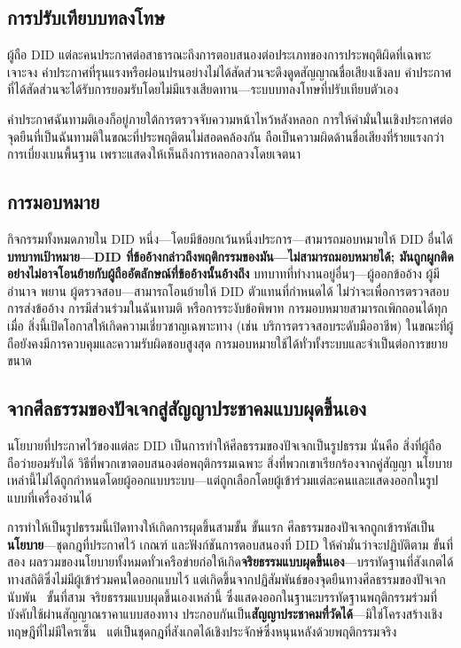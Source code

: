 \documentclass[11pt,a4paper,twocolumn]{article}
\begin{document}
\subsection{การปรับเทียบบทลงโทษ}

ผู้ถือ DID แต่ละคนประกาศต่อสาธารณะถึงการตอบสนองต่อประเภทของการประพฤติผิดที่เฉพาะเจาะจง คำประกาศที่รุนแรงหรือผ่อนปรนอย่างไม่ได้สัดส่วนจะดึงดูดสัญญาณชื่อเสียงเชิงลบ คำประกาศที่ได้สัดส่วนจะได้รับการยอมรับโดยไม่มีแรงเสียดทาน---ระบบบทลงโทษที่ปรับเทียบตัวเอง

คำประกาศฉันทามติเองก็อยู่ภายใต้การตรวจจับความหน้าไหว้หลังหลอก การให้คำมั่นในเชิงประกาศต่อจุดยืนที่เป็นฉันทามติในขณะที่ประพฤติตนไม่สอดคล้องกัน ถือเป็นความผิดด้านชื่อเสียงที่ร้ายแรงกว่าการเบี่ยงเบนพื้นฐาน เพราะแสดงให้เห็นถึงการหลอกลวงโดยเจตนา

\subsection{การมอบหมาย}

กิจกรรมทั้งหมดภายใน DID หนึ่ง---โดยมีข้อยกเว้นหนึ่งประการ---สามารถมอบหมายให้ DID อื่นได้ \textbf{บทบาทเป้าหมาย---DID ที่ข้ออ้างกล่าวถึงพฤติกรรมของมัน---ไม่สามารถมอบหมายได้; มันถูกผูกติดอย่างไม่อาจโอนย้ายกับผู้ถืออัตลักษณ์ที่ข้ออ้างนั้นอ้างถึง} บทบาทที่ทำงานอยู่อื่นๆ---ผู้ออกข้ออ้าง ผู้มีอำนาจ พยาน ผู้ตรวจสอบ---สามารถโอนย้ายให้ DID ตัวแทนที่กำหนดได้ ไม่ว่าจะเพื่อการตรวจสอบ การส่งข้ออ้าง การมีส่วนร่วมในฉันทามติ หรือการระงับข้อพิพาท การมอบหมายสามารถเพิกถอนได้ทุกเมื่อ สิ่งนี้เปิดโอกาสให้เกิดความเชี่ยวชาญเฉพาะทาง (เช่น บริการตรวจสอบระดับมืออาชีพ) ในขณะที่ผู้ถือยังคงมีการควบคุมและความรับผิดชอบสูงสุด การมอบหมายใช้ได้ทั่วทั้งระบบและจำเป็นต่อการขยายขนาด

\subsection{จากศีลธรรมของปัจเจกสู่สัญญาประชาคมแบบผุดขึ้นเอง}

นโยบายที่ประกาศไว้ของแต่ละ DID เป็นการทำให้ศีลธรรมของปัจเจกเป็นรูปธรรม นั่นคือ สิ่งที่ผู้ถือถือว่ายอมรับได้ วิธีที่พวกเขาตอบสนองต่อพฤติกรรมเฉพาะ สิ่งที่พวกเขาเรียกร้องจากคู่สัญญา นโยบายเหล่านี้ไม่ได้ถูกกำหนดโดยผู้ออกแบบระบบ---แต่ถูกเลือกโดยผู้เข้าร่วมแต่ละคนและแสดงออกในรูปแบบที่เครื่องอ่านได้

การทำให้เป็นรูปธรรมนี้เปิดทางให้เกิดการผุดขึ้นสามขั้น ขั้นแรก ศีลธรรมของปัจเจกถูกเข้ารหัสเป็น\textbf{นโยบาย}---ชุดกฎที่ประกาศไว้ เกณฑ์ และฟังก์ชันการตอบสนองที่ DID ให้คำมั่นว่าจะปฏิบัติตาม ขั้นที่สอง ผลรวมของนโยบายทั้งหมดทั่วเครือข่ายก่อให้เกิด\textbf{จริยธรรมแบบผุดขึ้นเอง}---บรรทัดฐานที่สังเกตได้ทางสถิติซึ่งไม่มีผู้เข้าร่วมคนใดออกแบบไว้ แต่เกิดขึ้นจากปฏิสัมพันธ์ของจุดยืนทางศีลธรรมของปัจเจกนับพัน~\cite{durkheim1893} ขั้นที่สาม จริยธรรมแบบผุดขึ้นเองเหล่านี้ ซึ่งแสดงออกในฐานะบรรทัดฐานพฤติกรรมร่วมที่บังคับใช้ผ่านสัญญาณราคาแบบสองทาง ประกอบกันเป็น\textbf{สัญญาประชาคมที่วัดได้}---มิใช่โครงสร้างเชิงทฤษฎีที่ไม่มีใครเซ็น~\cite{rawls1971} แต่เป็นชุดกฎที่สังเกตได้เชิงประจักษ์ซึ่งหนุนหลังด้วยพฤติกรรมจริง
\end{document}
